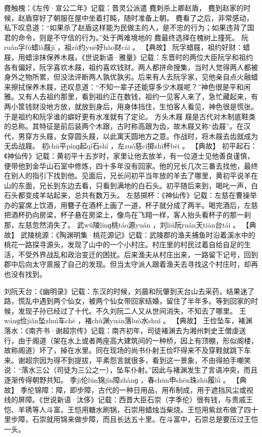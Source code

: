 \documentclass[12pt,UTF8]{ctexbook}
\begin{document}
 麑触槐：《左传·宣公二年》记载：晋灵公派遣
麑刺杀上卿赵盾，
麑到赵家的时候，赵盾穿好了朝服在屋中坐着打盹，随时准备上朝。
麑看了之后，非常感动，私下叹息道：“如果杀了赵盾这样能为民做主的人，是不忠的行为；如果违背了国君的命令，则是不守信的行为。”处于两难境地的
麑最终选择在槐树上撞死。
阮ruǎn孚fú蜡là屐jī
，祖zǔ约yuē好hào财cái
。
【典故】
阮孚蜡屐，祖约好财：蜡屐，用蜡涂抹保养木屐。《世说新语·雅量》记载：东晋时的两位大臣阮孚和祖约各有偏好，阮孚喜欢木屐，祖约喜欢钱财。两人都拼命搜集，当时人觉得两人都被身外之物所累，但没法评断两人孰优孰劣。后来有人去阮孚家，见他亲自点火融蜡来擦拭保养木屐，还叹息道：“不知一辈子还能穿多少木屐呢？”神色很是平和闲雅。又有人去祖约那里，看到祖约正在数钱，祖约一见客人来了，急忙藏起来，有两小筐钱财没地方放，就放到身后，用身体挡住，生怕客人看见，神色很是慌张。于是祖约和阮孚谁的癖好更有水准就有了定论。
方头木屐
屐是古代对木制底鞋类的总称。其特征是前后装两个木跟，古时称高跟为齿，故木屐又称“齿屐”。在汉代，男穿方头屐，女穿圆头屐，以此寓天圆地方之意。作战时，将木屐去齿就成为无齿战屐。
初chū平pínɡ起qǐ石shí
，左zuǒ慈cí掷zhì杯bēi
。
【典故】
初平起石：《神仙传》记载：黄初平十五岁时，家里让他去放羊，有一位道士见他善良谨慎，便带他到金华山石室中修炼，四十多年没有回家。他的兄长几次三番去找他，最终在别人的指引下找到他。见面后，兄长问初平当年放的羊去了哪里，黄初平说羊在山的东面，兄长到东边去看，只看到满地的白石头。初平随后来到，喝叱一声，白石头都变成羊站起来，总共有数万头。
左慈掷杯：《神仙传》记载：左慈在曹操举办的宴席上饮酒，用簪子在酒杯上画了一道，杯子就分成了两半。喝完酒后，左慈把酒杯扔向房梁，杯子悬在房梁上，像鸟在飞翔一样，客人抬头看杯子的那一刹那，左慈忽然消失了。
武wǔ陵línɡ桃táo源yuán
，刘liú阮ruǎn天tiān台tái
。
【典故】
武陵桃源：《陶渊明集·桃花源记》记载：武陵郡的渔夫捕鱼时沿着溪水中的桃花一路探寻源头，发现了山中的一个小村庄。村庄里的村民过着自给自足的生活，不受外界战乱和政治变迁的困扰。后来渔夫从村庄出来，一路留下记号，回到郡中后向太守禀报了自己的发现。但当太守派人跟着渔夫去寻找这个村庄时，却再也没有找到。

刘阮天台：《幽明录》记载：东汉的时候，刘晨和阮肇到天台山去采药，结果迷了路，慌乱中遇到两个仙女，被两个仙女带回家结婚，留住了半年多。等到回家的时候，发现子孙已经过了十代。不久刘阮二人又从世间消失，不知去了哪里。
王wánɡ俭jiǎn坠zhuì车chē
，褚chǔ渊yuān落luò水shuǐ
。
【典故】
王俭坠车，褚渊落水：《南齐书·谢超宗传》记载：南齐初年，司徒褚渊去为湘州刺史王僧虔送行，由于阁道（架在水上或者两座高大建筑间的一种桥，因上有顶棚，形似阁楼，故称阁道）坏了，掉在水里。同在现场的尚书仆射王俭吓得来不及穿鞋就跳下车来。谢超宗因为得不到提拔，平素怨言就很多，看到这一景象，不由得拍手嘲笑说：“落水三公（司徒为三公之一），坠车仆射。”因此与褚渊发生了言语冲突，而且逐渐传得朝野共知。
季jì伦lún锦jǐn障zhànɡ
，春chūn申shēn珠zhū履lǚ
。
【典故】
季伦锦障：障，即步障，古代的一种日用品，用布制成，用于遮挡风尘或视线的屏障。《世说新语·汰侈》记载：西晋大臣石崇（字季伦）很有钱，与贵戚王恺、羊琇等人斗富。王恺用糖水刷锅，石崇用蜡烛当柴烧。王恺用紫丝布做了四十里步障，石崇就用锦来做步障，而且长达五十里。在斗富中，石崇总是要压过王恺一头。
\end{document}
